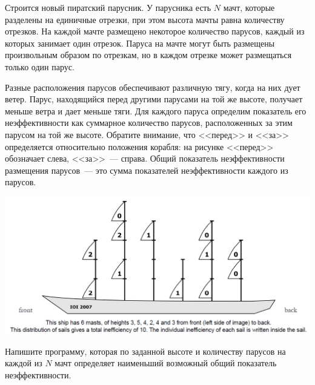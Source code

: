 Строится новый пиратский парусник. У парусника есть $N$ мачт, которые разделены на единичные
отрезки, при этом высота мачты равна количеству отрезков. На каждой мачте размещено некоторое
количество парусов, каждый из которых занимает один отрезок. Паруса на мачте могут быть размещены
произвольным образом по отрезкам, но в каждом отрезке может размещаться только один парус.

Разные расположения парусов обеспечивают различную тягу, когда на них дует ветер. Парус,
находящийся перед другими парусами на той же высоте, получает меньше ветра и дает меньше тяги. Для
каждого паруса определим показатель его неэффективности как суммарное количество парусов,
расположенных за этим парусом на той же высоте. Обратите внимание, что <<перед>> и <<за>> определяется
относительно положения корабля: на рисунке <<перед>> обозначает слева, <<за>>~--- справа.
Общий показатель неэффективности размещения парусов~--- это сумма показателей
неэффективности каждого из парусов. 


\includegraphics[scale=0.6]{sails.png}


Напишите программу, которая по заданной высоте и количеству парусов на каждой из $N$ мачт
определяет наименьший возможный общий показатель неэффективности. 